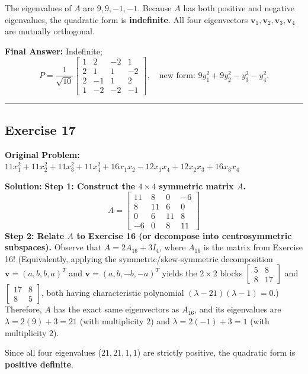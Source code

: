 \documentclass[11pt, letterpaper]{article}
\theoremstyle{definition}
\theoremstyle{remark}
\begin{document}
The eigenvalues of $A$ are $9, 9, -1, -1$. Because $A$ has both positive and negative eigenvalues, the quadratic form is \textbf{indefinite}. All four eigenvectors $\mathbf{v}_1, \mathbf{v}_2, \mathbf{v}_3, \mathbf{v}_4$ are mutually orthogonal.

\textbf{Final Answer:} Indefinite;
\[
P = \frac{1}{\sqrt{10}} \begin{bmatrix} 1 & 2 & -2 & 1 \\ 2 & 1 & 1 & -2 \\ 2 & -1 & 1 & 2 \\ 1 & -2 & -2 & -1 \end{bmatrix}, \quad \text{new form: } 9y_1^2 + 9y_2^2 - y_3^2 - y_4^2.
\]

\medskip\hrule\medskip

\subsection*{Exercise 17}
\textbf{Original Problem:} $11x_1^2 + 11x_2^2 + 11x_3^2 + 11x_4^2 + 16x_1x_2 - 12x_1x_4 + 12x_2x_3 + 16x_3x_4$

\textbf{Solution:}
\textbf{Step 1: Construct the $4 \times 4$ symmetric matrix $A$.}
\[
A = \begin{bmatrix} 11 & 8 & 0 & -6 \\ 8 & 11 & 6 & 0 \\ 0 & 6 & 11 & 8 \\ -6 & 0 & 8 & 11 \end{bmatrix}
\]
\textbf{Step 2: Relate $A$ to Exercise 16 (or decompose into centrosymmetric subspaces).}
Observe that $A = 2 A_{16} + 3I_4$, where $A_{16}$ is the matrix from Exercise 16! (Equivalently, applying the symmetric/skew-symmetric decomposition $\mathbf{v} = (a, b, b, a)^T$ and $\mathbf{v} = (a, b, -b, -a)^T$ yields the $2 \times 2$ blocks $\begin{bmatrix} 5 & 8 \\ 8 & 17 \end{bmatrix}$ and $\begin{bmatrix} 17 & 8 \\ 8 & 5 \end{bmatrix}$, both having characteristic polynomial $(\lambda - 21)(\lambda - 1) = 0$.)
Therefore, $A$ has the exact same eigenvectors as $A_{16}$, and its eigenvalues are $\lambda = 2(9) + 3 = 21$ (with multiplicity $2$) and $\lambda = 2(-1) + 3 = 1$ (with multiplicity $2$).

Since all four eigenvalues ($21, 21, 1, 1$) are strictly positive, the quadratic form is \textbf{positive definite}.
\end{document}
